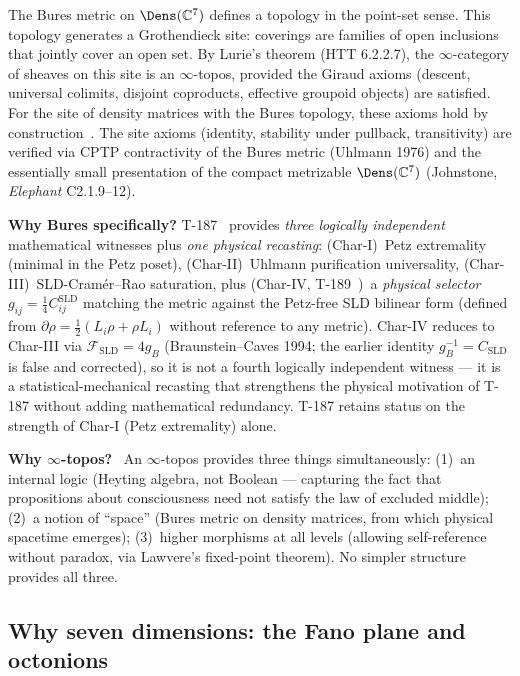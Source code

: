 The Bures metric on $\Dens(\mathbb{C}^7)$ defines a topology in the point-set sense. This topology generates a Grothendieck site: coverings are families of open inclusions that jointly cover an open set. By Lurie's theorem (HTT 6.2.2.7), the $\infty$-category of sheaves on this site is an $\infty$-topos, provided the Giraud axioms (descent, universal colimits, disjoint coproducts, effective groupoid objects) are satisfied. For the site of density matrices with the Bures topology, these axioms hold by construction~\cite{lurie2009}. The site axioms (identity, stability under pullback, transitivity) are verified via CPTP contractivity of the Bures metric (Uhlmann 1976) and the essentially small presentation of the compact metrizable $\Dens(\mathbb{C}^7)$ (Johnstone, \emph{Elephant} C2.1.9--12).

\textbf{Why Bures specifically?} T-187~ provides \emph{three logically
independent} mathematical witnesses plus \emph{one physical recasting}: (Char-I)~Petz
extremality (minimal in the Petz poset), (Char-II)~Uhlmann purification universality,
(Char-III)~SLD-Cram\'{e}r--Rao saturation, plus (Char-IV, T-189~)~a
\emph{physical selector} $g_{ij} = \tfrac14 C^{\mathrm{SLD}}_{ij}$ matching the metric
against the Petz-free SLD bilinear form (defined from
$\partial\rho = \tfrac12(L_i\rho + \rho L_i)$ without reference to any metric). Char-IV
reduces to Char-III via $\mathcal F_{\mathrm{SLD}} = 4g_B$ (Braunstein--Caves 1994; the
earlier identity $g_B^{-1} = C_{\mathrm{SLD}}$ is false and corrected), so it is
not a fourth logically independent witness --- it is a statistical-mechanical recasting
that strengthens the physical motivation of T-187 without adding mathematical redundancy.
T-187 retains status  on the strength of Char-I (Petz extremality) alone.

\textbf{Why $\infty$-topos?}~\cite{lurie2009} An $\infty$-topos provides three things simultaneously:
(1)~an internal logic (Heyting algebra, not Boolean --- capturing the fact that propositions
about consciousness need not satisfy the law of excluded middle);
(2)~a notion of ``space'' (Bures metric on density matrices, from which physical spacetime
emerges); (3)~higher morphisms at all levels (allowing self-reference without paradox,
via Lawvere's fixed-point theorem). No simpler structure provides all three.

\subsection{Why seven dimensions: the Fano plane and octonions}
\label{subsec:why-seven}

